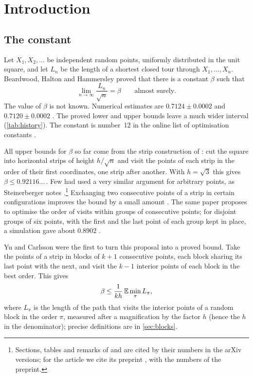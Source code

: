 \section{Introduction}\label{sec:intro}

\subsection{The constant}

Let $X_1,X_2,\dots$ be independent random points, uniformly distributed in the unit square, and let $L_n$ be the length of a shortest closed tour through $X_1,\dots,X_n$. Beardwood, Halton and Hammersley \cite{BeardwoodHaltonHammersley1959} proved that there is a constant $\beta$ such that
\[
\lim_{n\to\infty}\frac{L_n}{\sqrt n}=\beta\qquad\text{almost surely.}
\]
The value of $\beta$ is not known. Numerical estimates are $0.7124\pm0.0002$ \cite{JohnsonMcGeochRothberg1996} and $0.7120\pm0.0002$ \cite{PercusMartin1996}. The proved lower and upper bounds leave a much wider interval (\cref{tab:history}). The constant is number~12 in the online list of optimisation constants \cite{optimisation-constants-repo}.

All upper bounds for $\beta$ so far come from the strip construction of \cite{BeardwoodHaltonHammersley1959}: cut the square into horizontal strips of height $h/\sqrt n$ and visit the points of each strip in the order of their first coordinates, one strip after another. With $h=\sqrt3$ this gives $\beta\le0.92116\ldots$\,. Few \cite{Few1955} had used a very similar argument for arbitrary points, as Steinerberger notes \cite[Section~2.2]{Steinerberger2015}.\footnote{Sections, tables and remarks of \cite{Steinerberger2015} and \cite{GaudioGuan2026} are cited by their numbers in the arXiv versions; for the article \cite{CarlssonYu2026} we cite its preprint \cite{YuCarlsson2023}, with the numbers of the preprint.} Exchanging two consecutive points of a strip in certain configurations improves the bound by a small amount \cite{Steinerberger2015}. The same paper proposes to optimise the order of visits within groups of consecutive points; for disjoint groups of six points, with the first and the last point of each group kept in place, a simulation gave about $0.8902$ \cite[Section~2.5]{Steinerberger2015}.

Yu and Carlsson \cite{YuCarlsson2023} were the first to turn this proposal into a proved bound. Take the points of a strip in blocks of $k+1$ consecutive points, each block sharing its last point with the next, and visit the $k-1$ interior points of each block in the best order. This gives
\begin{equation}\label{eq:tuple}
\beta\le\frac{1}{kh}\,\mathbb{E}\min_\pi L_\pi ,
\end{equation}
where $L_\pi$ is the length of the path that visits the interior points of a random block in the order $\pi$, measured after a magnification by the factor $h$ (hence the $h$ in the denominator); precise definitions are in \cref{sec:blocks}.

